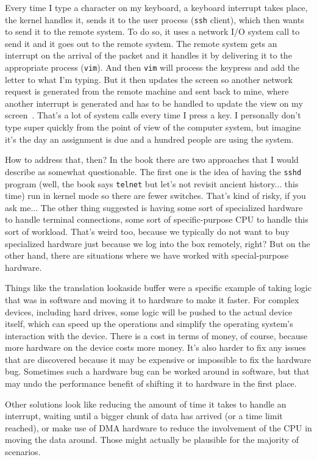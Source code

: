 Every time I type a character on my keyboard, a keyboard interrupt takes place, the kernel handles it, sends it to the user process (\texttt{ssh} client), which then wants to send it to the remote system. To do so, it uses a network I/O system call to send it and it goes out to the remote system. The remote system gets an interrupt on the arrival of the packet and it handles it by delivering it to the appropriate process (\texttt{vim}). And then \texttt{vim} will process the keypress and add the letter to what I'm typing. But it then updates the screen so another network request is generated from the remote machine and sent back to mine, where another interrupt is generated and has to be handled to update the view on my screen~\cite{osc}. That's a lot of system calls every time I press a key. I personally don't type super quickly from the point of view of the computer system, but imagine it's the day an assignment is due and a hundred people are using the system.

How to address that, then? In the book there are two approaches that I would describe as somewhat questionable. The first one is the idea of having the \texttt{sshd} program (well, the book says \texttt{telnet} but let's not revisit ancient history... this time) run in kernel mode so there are fewer switches. That's kind of risky, if you ask me... The other thing suggested is having some sort of specialized hardware to handle terminal connections, some sort of specific-purpose CPU to handle this sort of workload. That's weird too, because we typically do not want to buy specialized hardware just because we log into the box remotely, right? But on the other hand, there are situations where we have worked with special-purpose hardware.

Things like the translation lookaside buffer were a specific example of taking logic that was in software and moving it to hardware to make it faster. For complex devices, including hard drives, some logic will be pushed to the actual device itself, which can speed up the operations and simplify the operating system's interaction with the device. There is a cost in terms of money, of course, because more hardware on the device costs more money. It's also harder to fix any issues that are discovered because it may be expensive or impossible to fix the hardware bug. Sometimes such a hardware bug can be worked around in software, but that may undo the performance benefit of shifting it to hardware in the first place.

Other solutions look like reducing the amount of time it takes to handle an interrupt, waiting until a bigger chunk of data has arrived (or a time limit reached), or make use of DMA hardware to reduce the involvement of the CPU in moving the data around. Those might actually be plausible for the majority of scenarios.


